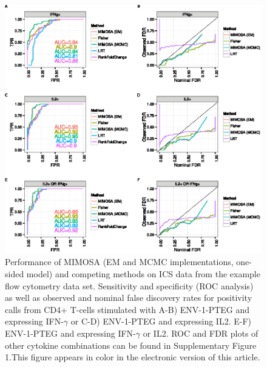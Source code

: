 \documentclass[12pt,oupdraft]{biostatistics}
\begin{document}
\begin{figure} %
   \centering
   \includegraphics[width=0.75\columnwidth]{FIG1.eps}
   \caption{Performance of MIMOSA (EM and MCMC implementations, one-sided model) and competing methods on ICS data from the example flow cytometry data set. Sensitivity and specificity (ROC analysis) as well as observed and nominal false discovery rates for positivity calls from CD4+ T-cells stimulated with A-B) ENV-1-PTEG and expressing IFN-$\gamma$ or C-D) ENV-1-PTEG and expressing IL2. E-F) ENV-1-PTEG and expressing IFN-$\gamma$ or IL2. ROC and FDR plots of other cytokine combinations can be found in Supplementary Figure 1.This figure appears in color in the electronic version of this article.}
\label{fig:HVTN065}
\end{figure}
\end{document}
